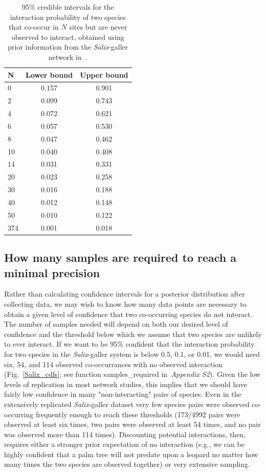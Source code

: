 \documentclass[12pt]{article}
\begin{document}
      \begin{table}[h]
        \caption{95\% credible intervals for the interaction probability of two species that co-occur in $N$ sites but are never observed to interact, obtained using prior information from the \emph{Salix}-galler network in~\citet{Barbour2016,Barbour2016Dryad}.}
        \label{interval_table}
        \begin{tabular}{l | c c}
        N & Lower bound & Upper bound \\
        \hline
        0   & 0.157 & 0.901 \\
        2   & 0.099 & 0.743 \\
        4   & 0.072 & 0.621 \\
        6   & 0.057 & 0.530 \\
        8   & 0.047 & 0.462 \\
        10 & 0.040 & 0.408 \\
        14 & 0.031 & 0.331 \\
        20 & 0.023 & 0.258 \\
        30 & 0.016 & 0.188 \\
        40 & 0.012 & 0.148 \\
        50 & 0.010 & 0.122 \\
        \hline
        374 & 0.001 & 0.018 \\
        \hline
        \end{tabular}
        \end{table}


  \subsection*{How many samples are required to reach a minimal precision}

      Rather than calculating confidence intervals for a posterior distribution after collecting data, we may wish to know how many data points are necessary to obtain a given level of confidence that two co-occurring species do not interact. The number of samples needed will depend on both our desired level of confidence and the threshold below which we assume that two species are unlikely to ever interact. If we want to be 95\% confident that the interaction probability for two species in the \emph{Salix}-galler system is below 0.5, 0.1, or 0.01, we would need six, 54, and 114 observed co-occurrances with no observed interaction (Fig.~\ref{Salix_cdfs}; see function samples\_required in~\emph{Appendix S2}). Given the low levels of replication in most network studies, this implies that we should have fairly low confidence in many "non-interacting" pairs of species. Even in the extensively replicated \emph{Salix}-galler dataset very few species pairs were observed co-occurring frequently enough to reach these thresholds (173/4992 pairs were observed at least six times, two pairs were observed at least 54 times, and no pair was observed more than 114 times). Discounting potential interactions, then, requires either a stronger prior expectation of no interaction (e.g., we can be highly confident that a palm tree will not predate upon a leopard no matter how many times the two species are observed together) or very extensive sampling.
\end{document}
